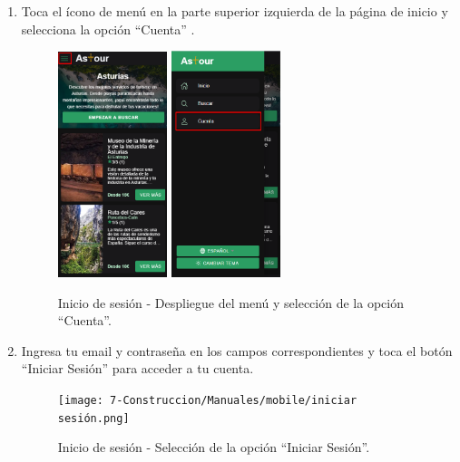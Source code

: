 \begin{enumerate}
	\item Toca el ícono de menú en la parte superior izquierda de la página de inicio y selecciona la opción “Cuenta” .
	      \begin{figure}[H]
		      \centering
		      \includegraphics[width=0.3\textwidth]{7-Construccion/Manuales/mobile/menu marcado.png}
		      \includegraphics[width=0.3\textwidth]{7-Construccion/Manuales/mobile/cuenta marcado.png}
		      \caption{Inicio de sesión - Despliegue del menú y selección de la opción “Cuenta”.}
	      \end{figure}
	\item Ingresa tu email y contraseña en los campos correspondientes y toca el botón “Iniciar Sesión” para acceder a tu cuenta.
	      \begin{figure}[H]
		      \centering
		      \texttt{[image: 7-Construccion/Manuales/mobile/iniciar sesión.png]}
		      \caption{Inicio de sesión - Selección de la opción “Iniciar Sesión”.}
	      \end{figure}
\end{enumerate}

